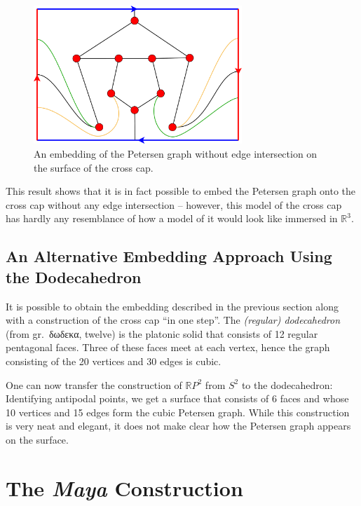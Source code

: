 \documentclass[11pt,            %
               a4paper,         %
               oneside,         %
               DIV12,           %
               fleqn,           %
               halfparskip,     %
               nochapterprefix, %
              ]{scrartcl} %
\theoremstyle{definition}
\begin{document}
\begin{figure}[h]
  \centering
  \includegraphics[keepaspectratio=true,width=0.7\textwidth]{../planar-graphs/crosscap-embedding-5.pdf}
  \caption{An embedding of the Petersen graph without edge
    intersection on the surface of the cross cap.}
  \label{fig:rp2embedding}
\end{figure}

This result shows that it is in fact possible to embed the Petersen
graph onto the cross cap without any edge intersection -- however,
this model of the cross cap has hardly any resemblance of how a model
of it would look like immersed in $\mathbb{R}^3$.


\subsection{An Alternative Embedding Approach Using the Dodecahedron}
\label{sec:dodecahedron}

It is possible to obtain the embedding described in the previous
section along with a construction of the cross cap “in one step”. The
\emph{(regular) dodecahedron} (from gr.~\textgreek{δωδεκα}, twelve) is
the platonic solid that consists of 12 regular pentagonal faces. Three
of these faces meet at each vertex, hence the graph consisting of the
20 vertices and 30 edges is cubic.

One can now transfer the construction of $\mathbb{R}P^2$ from $S^2$ to
the dodecahedron: Identifying antipodal points, we get a surface that
consists of 6 faces and whose 10 vertices and 15 edges form the cubic
Petersen graph. While this construction is very neat and elegant, it
does not make clear how the Petersen graph appears on the surface.

\section{The \emph{Maya} Construction}
\label{sec:maya}
\end{document}
